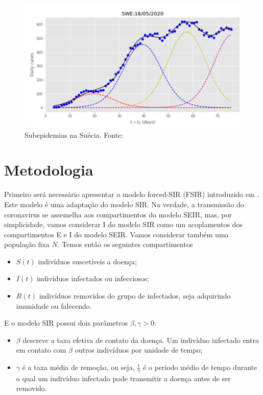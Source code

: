 \documentclass{article}
\begin{document}
\begin{figure}[H]
    \centering
    \includegraphics[width=0.8\linewidth]{corona2.png}
    \caption{Subepidemias na Suécia. Fonte: \citep{multiwave}}
    \label{fig:my_label2}
\end{figure}

\section{Metodologia}
\label{Metodologia}
Primeiro será necessário apresentar o modelo forced-SIR (FSIR) introduzido em \citep{thefirst100days}. Este modelo é uma adaptação do modelo SIR. Na verdade, a transmissão do coronavirus se assemelha aos compartimentos do modelo SEIR, mas, por simplicidade, vamos considerar I do modelo SIR como um acoplamentos dos compartimentos E e I do modelo SEIR. Vamos considerar também uma população fixa $N$. Temos então os seguintes compartimentos

\begin{itemize}
    \item 
    $S(t)$ indivíduos suscetíveis a doença;
    \item
    $I(t)$ indivíduos infectados ou infecciosos;
    \item
    $R(t)$ indivíduos removidos do grupo de infectados, seja adquirindo imunidade ou falecendo.
\end{itemize}

E o modelo SIR possui dois parâmetros $\beta, \gamma > 0$:

\begin{itemize}
    \item $\beta$ descreve a taxa efetiva de contato da doença. Um indivíduo infectado entra em contato com $\beta$ outros indivíduos por unidade de tempo;
    
    \item $\gamma$ é a taxa média de remoção, ou seja, $\frac{1}{\gamma}$ é o período médio de tempo durante o qual um indivíduo infectado pode transmitir a doença antes de ser removido.
\end{itemize}
\end{document}
